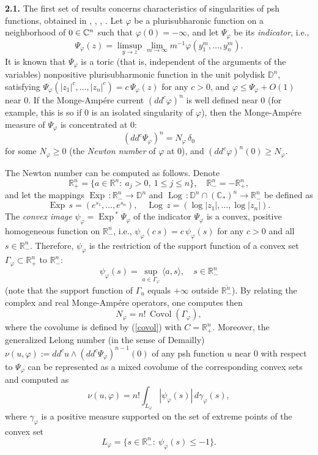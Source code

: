 \documentclass[12pt]{article}
\newcommand{\beq}{\begin{equation}}
\newcommand{\eeq}{\end{equation}}
\numberwithin{equation}{section}
\newcommand{\Covol}{{\operatorname{Covol}}}
\newcommand{\Log}{{\operatorname{Log}\,}}
\newcommand{\Exp}{{\operatorname{Exp}\,}}
\newcommand{\D}{{\mathbb D}}
\newcommand{\Rn}{{\mathbb R}^n}
\newcommand{\Rnm}{{\mathbb R}_-^n}
\newcommand{\Rnp}{{\mathbb R}_+^n}
\newcommand{\C}{{\mathbb  C}}
\newcommand{\Cn}{{\mathbb  C\sp n}}
\newcommand{\vph}{\varphi}
\begin{document}
\bigskip
\noindent
{\bf 2.1.}
 The first set of results concerns characteristics of singularities of psh functions, obtained in \cite{LeR},  \cite{R3}, \cite{R4}, \cite{R9}. Let $\vph$ be a plurisubharonic function on a neighborhood of $0\in\Cn$ such that $\vph(0)=-\infty$, and let $\Psi_\vph$ be its {\it indicator}, i.e.,
\beq\label{indic} \Psi_\vph(z)=\limsup_{y\to z} \lim_{m\to \infty} m^{-1}\vph(y_1^m,\ldots,y_n^m).\eeq
It is known that $\Psi_\vph$ is a toric (that is, independent of the arguments of the variables) nonpositive plurisubharmonic function in the unit polydisk $\D^n$, satisfying
$\Psi_\vph(|z_1|^c,\ldots,|z_n|^c)=c\,\Psi_\vph(z)$ for any $c>0$, and
$\vph\le \Psi_\vph+O(1)$ near $0$. If the Monge-Amp\'ere current $(dd^c \vph)^n$ is well defined near $0$ (for example, this is so if $0$ is an isolated singularity of $\vph$), then the Monge-Amp\'ere measure of $\Psi_\vph$ is concentrated at $0$:
\beq\label{Psi}(dd^c\Psi_\vph)^n=N_\vph\,\delta_0\eeq
 for some $N_\vph\ge 0$ (the {\it Newton number} of $\vph$ at $0$), and $(dd^c \vph)^n(0)\ge N_\vph$.

The Newton number can be computed as follows. Denote $$\Rnp=\{a\in\Rn:\: a_j>0,\ 1\le j\le n\},\quad \Rnm=-\Rnp,$$
and let the mappings $ \Exp: \Rnm\to\D^n$ and $\Log: \D^n\cap (\C_*)^n\to \Rnm$ be defined as
$$\Exp s = (e^{s_1},\ldots,e^{s_n}),\quad \Log z=(\log|z_1|,\ldots,\log|z_n|).$$ The {\it convex image} $\psi_\vph=\Exp^*\Psi_\vph$ of the indicator $\Psi_\vph$ is a convex, positive homogeneous function on $\Rnm$, i.e., $\psi_\vph(c\,s)=c\,\psi_\vph(s)$ for any $c>0$ and all $s\in\Rnm$. Therefore, $\psi_\vph$ is the restriction of the support function of a convex set $\Gamma_\vph\subset\Rnp$ to $\Rnm$:
$$\psi_\vph(s)=\sup_{a\in\Gamma_\vph} \langle a,s\rangle,\quad s\in\Rnm$$
(note that the support function of $\Gamma_u $ equals $+\infty$ outside $\overline{\Rnm}$). By relating the complex and real Monge-Amp\'ere operators, one computes then
\beq\label{Nvol} N_\vph=n!\,\Covol( \Gamma_\vph),\eeq
where the covolume is defined by (\ref{covol}) with $C=\Rnp$.
Moreover, the generalized Lelong number (in the sense of Demailly) $\nu(u,\vph):=dd^cu\wedge (dd^c\Psi_\vph)^{n-1}(0)$ of any psh function $u$ near $0$ with respect to $\Psi_\vph$ can be represented as a mixed covolume of the corresponding convex sets and computed as
$$\nu(u,\vph)=n!\int_{L_\vph} |\psi_\vph(s)|\,d\gamma_\vph(s),$$
where $\gamma_\vph$ is a positive measure supported on the set of extreme points of the convex set
\beq\label{Lvph} L_\vph=\{s\in\Rnm:\: \psi_\vph(s)\le -1\}.\eeq
\end{document}
